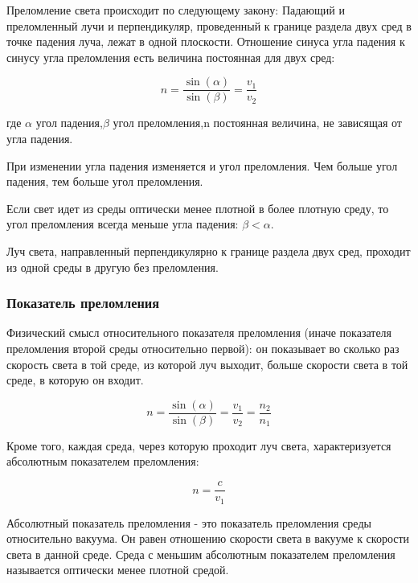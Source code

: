 \documentclass[12pt,a4paper,draft]{article}
\begin{document}
    Преломление света происходит по следующему закону:
    Падающий и преломленный лучи и перпендикуляр, проведенный к границе раздела двух сред в точке падения луча, лежат в одной плоскости. Отношение синуса угла падения к синусу угла преломления есть величина постоянная для двух сред:

    \begin{equation}%
        \label{koef_prilom}
        n = \frac{\sin(\alpha)}{\sin(\beta)} = \frac{v_1}{v_2}
    \end{equation}

    где $\alpha$  угол падения,$\beta$  угол преломления,n  постоянная величина, не зависящая от угла падения.

    При изменении угла падения изменяется и угол преломления. Чем больше угол падения, тем больше угол преломления.

    Если свет идет из среды оптически менее плотной в более плотную среду, то угол преломления всегда меньше угла падения: $\beta < \alpha$.

    Луч света, направленный перпендикулярно к границе раздела двух сред, проходит из одной среды в другую без преломления.

    \subsubsection{Показатель преломления}
        Физический смысл относительного показателя преломления (иначе показателя преломления второй среды относительно первой): он показывает во сколько раз скорость света в той среде, из которой луч выходит, больше скорости света в той среде, в которую он входит.

        \begin{equation}
            n = \frac{\sin(\alpha)}{\sin(\beta)} = \frac{v_1}{v_2} = \frac{n_2}{n_1}
        \end{equation}

        Кроме того, каждая среда, через которую проходит луч света, характеризуется абсолютным показателем преломления:

        \begin{equation}
            n = \frac{c}{v_1}
        \end{equation}

        Абсолютный показатель преломления - это показатель преломления среды относительно вакуума. Он равен отношению скорости света в вакууме к скорости света в данной среде.
        Среда с меньшим абсолютным показателем преломления называется оптически менее плотной средой.
\end{document}
